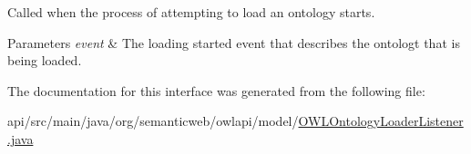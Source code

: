 Called when the process of attempting to load an ontology starts. 
\begin{DoxyParams}{Parameters}
{\em event} & The loading started event that describes the ontologt that is being loaded. \\
\hline
\end{DoxyParams}


The documentation for this interface was generated from the following file\-:\begin{DoxyCompactItemize}
\item 
api/src/main/java/org/semanticweb/owlapi/model/\hyperlink{_o_w_l_ontology_loader_listener_8java}{O\-W\-L\-Ontology\-Loader\-Listener.\-java}\end{DoxyCompactItemize}
